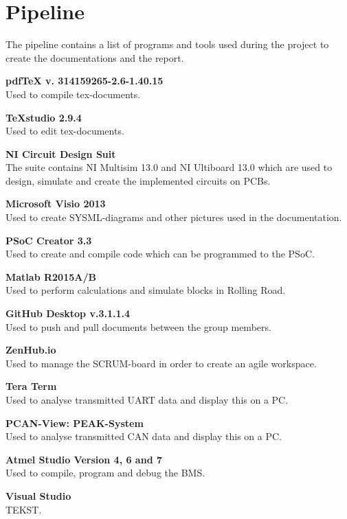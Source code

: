 \chapter{Pipeline}
The pipeline contains a list of programs and tools used during the project to create the documentations and the report.

\textbf{pdfTeX v. 314159265-2.6-1.40.15}\\
Used to compile tex-documents.

\textbf{TeXstudio 2.9.4}\\
Used to edit tex-documents.

\textbf{NI Circuit Design Suit}\\
The suite contains NI Multisim 13.0 and NI Ultiboard 13.0 which are used to design, simulate and create the implemented circuits on PCBs.

\textbf{Microsoft Visio 2013}\\
Used to create SYSML-diagrams and other pictures used in the documentation.

\textbf{PSoC Creator 3.3}\\
Used to create and compile code which can be programmed to the PSoC.

\textbf{Matlab R2015A/B}\\
Used to perform calculations and simulate blocks in Rolling Road.

\textbf{GitHub Desktop v.3.1.1.4}\\
Used to push and pull documents between the group members.

\textbf{ZenHub.io}\\
Used to manage the SCRUM-board in order to create an agile workspace.

\textbf{Tera Term}\\
Used to analyse transmitted UART data and display this on a PC.

\textbf{PCAN-View: PEAK-System}\\
Used to analyse transmitted CAN data and display this on a PC.

\textbf{Atmel Studio Version 4, 6 and 7}\\ 
Used to compile, program and debug the BMS.

\textbf{Visual Studio}\\
TEKST.

